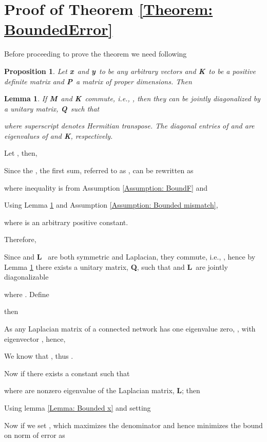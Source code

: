 \documentclass[conference]{IEEEtran}
\newtheorem{proposition}{Proposition}
\newtheorem{lemma}{Lemma}
\def\bx{\mbox{{\bf x}}}
\def\by{\mbox{{\bf y}}}
\def\bK{\mbox{{\bf K}}}
\def\bL{\mbox{{\bf L}}}
\def\bM{\mbox{{\bf M}}}
\def\bP{\mbox{{\bf P}}}
\def\bQ{\mbox{{\bf Q}}}
\begin{document}
\appendices
\section{Proof of Theorem \ref{Theorem: BoundedError}}\label{Proof: BoundedError}
	\begin{IEEEproof}
	 Before proceeding to prove the theorem we need following 
	 \begin{proposition}\label{Lemma: Vector Product Inequality}
		Let \bx~and \by~to be any arbitrary vectors and \bK~to be a positive definite matrix and \bP~a matrix of proper dimensions. Then
			
	\end{proposition}
	\begin{lemma}\cite{Prasolov}\label{Lemma: Joint Diagonalization}
			If \bM~and \bK~commute, i.e., , then they can be jointly diagonalized by a unitary matrix, \bQ~such that
			
			where superscript  denotes Hermitian transpose. The diagonal entries of  and  are eigenvalues of  and \bK, respectively.
	\end{lemma}
		Let , then,
		
		Since the , the first sum, referred to as , can be rewritten as
		
		
		where inequality  is from Assumption \ref{Assumption: BoundF} and
		
		Using Lemma \ref{Lemma: Vector Product Inequality} and Assumption \ref{Assumption: Bounded mismatch}, 
		
		where  is an arbitrary positive constant. 
		
		Therefore,
		
		Since  and \bL~ are both symmetric and Laplacian, they commute, i.e., , hence by Lemma \ref{Lemma: Joint Diagonalization} there exists a unitary matrix, \bQ, such that  and \bL~are jointly diagonalizable 
		
		where .
		Define
					
				then
					
						
				{As any Laplacian matrix of a connected network has one eigenvalue zero, , with eigenvector , hence,}
					
				We know that , thus .
					
				Now if there exists a constant  such that
						
						where  are nonzero eigenvalue of the Laplacian matrix, \bL; then
						
				Using lemma \ref{Lemma: Bounded x} and setting 
						
			Now if we set , which maximizes the denominator and hence minimizes the bound on norm of error as
			
	\end{IEEEproof} 
\end{document}
